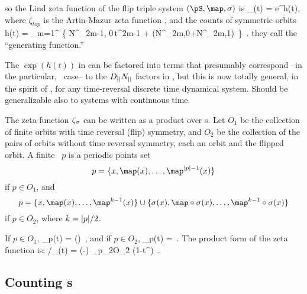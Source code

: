 so the Lind zeta function of the flip triple system $(\pS,\map,\Refl)$ is
\beq
\zeta_{\Refl}(t) =  \; e^{h(t)},
where $\zeta_{top}$ is the
Artin-Mazur zeta function ,  %
and the counts of symmetric orbits
\beq
h(t) = \sum_{m=1}^{\infty} \left\{
       N^{\Refl}_{2m-1, 0}\,t^{2m-1}
       + \left(N^{\Refl}_{2m,0}+N^{\Refl}_{2m,1}\right)\,
                               \right\}
\,.
they call the ``generating function.''

The $\exp(h(t))$ in  can be factored into terms that
presumably correspond --in the particular, \Henon\ case-- to the
$D_{||}N_{||}$ factors in , but this is now totally
general, in the spirit of , for
any time-reversal discrete time dynamical system. Should be generalizable
also to systems with continuous time.

The zeta function $\zeta_{\sigma}$ can be written as a product over
{\orbit}s. Let $O_1$ be the collection of finite orbits with time
reversal (flip) symmetry, and $O_2$ be the collection of the pairs of
orbits without time reversal symmetry, each an orbit and the flipped
orbit. A finite \orbit\ $p$ is a periodic points set
\[
p = \{\ssp, \map(\ssp), \dots, \map^{\cl{p}-1}(\ssp)\}
\]
if $p \in O_1$, and
\[
p = \{\ssp, \map(\ssp), \dots, \map^{k-1}(\ssp)\} \cup
\{\Refl(\ssp), \map\circ\Refl(\ssp), \dots, \map^{k-1}\circ\Refl(\ssp)\}
\]
if $p \in O_2$, where $k={|p|}/2$.

If $p \in O_1$,
\beq
\zeta_{p}(t) =
\exp\left(\right)
\,,
and if $p \in O_2$,
\beq
\zeta_{p}(t) =
\,.
The product form of the zeta function is:
/\zeta_{\Refl}(t) =
      \;\exp\left(-\right)
\prod_{p_2\in O_2} (1-t^{})
\,.

\subsection{Counting {\lattstate}s}
\label{sect:PeriodicPsCount}

